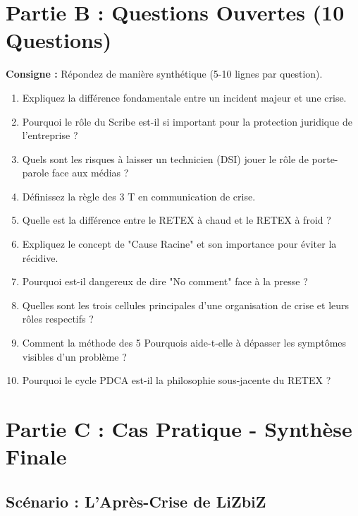 \section{Partie B : Questions Ouvertes (10 Questions)}

\textbf{Consigne :} Répondez de manière synthétique (5-10 lignes par question).

\begin{enumerate}
    \item Expliquez la différence fondamentale entre un incident majeur et une crise.
    \item Pourquoi le rôle du Scribe est-il si important pour la protection juridique de l'entreprise ?
    \item Quels sont les risques à laisser un technicien (DSI) jouer le rôle de porte-parole face aux médias ?
    \item Définissez la règle des 3 T en communication de crise.
    \item Quelle est la différence entre le RETEX à chaud et le RETEX à froid ?
    \item Expliquez le concept de "Cause Racine" et son importance pour éviter la récidive.
    \item Pourquoi est-il dangereux de dire "No comment" face à la presse ?
    \item Quelles sont les trois cellules principales d'une organisation de crise et leurs rôles respectifs ?
    \item Comment la méthode des 5 Pourquois aide-t-elle à dépasser les symptômes visibles d'un problème ?
    \item Pourquoi le cycle PDCA est-il la philosophie sous-jacente du RETEX ?
\end{enumerate}

\section{Partie C : Cas Pratique - Synthèse Finale}

\subsection{Scénario : L'Après-Crise de LiZbiZ}

